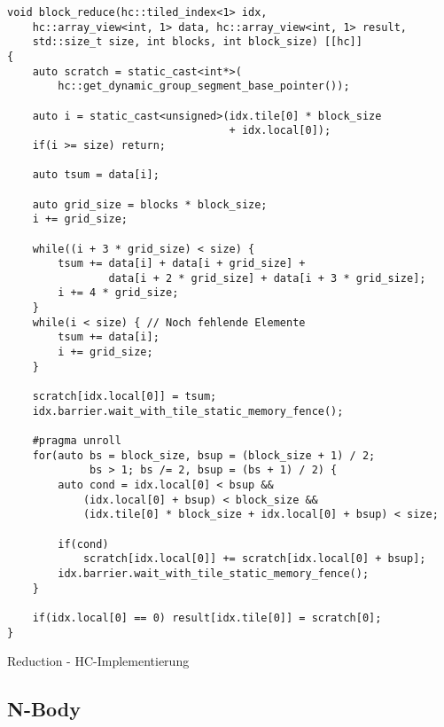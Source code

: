 \begin{code}
    \begin{verbatim}
void block_reduce(hc::tiled_index<1> idx,
    hc::array_view<int, 1> data, hc::array_view<int, 1> result,
    std::size_t size, int blocks, int block_size) [[hc]]
{
    auto scratch = static_cast<int*>(
        hc::get_dynamic_group_segment_base_pointer());

    auto i = static_cast<unsigned>(idx.tile[0] * block_size
                                   + idx.local[0]);
    if(i >= size) return;

    auto tsum = data[i];

    auto grid_size = blocks * block_size;
    i += grid_size;

    while((i + 3 * grid_size) < size) {
        tsum += data[i] + data[i + grid_size] +
                data[i + 2 * grid_size] + data[i + 3 * grid_size];
        i += 4 * grid_size;
    }
    while(i < size) { // Noch fehlende Elemente
        tsum += data[i];
        i += grid_size;
    }

    scratch[idx.local[0]] = tsum;
    idx.barrier.wait_with_tile_static_memory_fence();

    #pragma unroll
    for(auto bs = block_size, bsup = (block_size + 1) / 2;
             bs > 1; bs /= 2, bsup = (bs + 1) / 2) {
        auto cond = idx.local[0] < bsup &&
            (idx.local[0] + bsup) < block_size &&
            (idx.tile[0] * block_size + idx.local[0] + bsup) < size;

        if(cond)
            scratch[idx.local[0]] += scratch[idx.local[0] + bsup];
        idx.barrier.wait_with_tile_static_memory_fence();
    }

    if(idx.local[0] == 0) result[idx.tile[0]] = scratch[0];
}
    \end{verbatim}
    \caption{Reduction - HC-Implementierung}
    \label{anhang:hc:reduction}
\end{code}

\subsection{N-Body}

